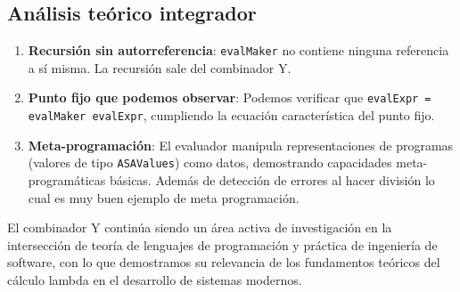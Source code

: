 \documentclass[11pt]{article}
\begin{document}
\subsection{Análisis teórico integrador}
\begin{enumerate}
    \item \textbf{Recursión sin autorreferencia}: \texttt{evalMaker} no contiene ninguna referencia a sí misma. La recursión sale del combinador Y.

    \item \textbf{Punto fijo que podemos observar}: Podemos verificar que \texttt{evalExpr = evalMaker evalExpr}, cumpliendo la ecuación característica del punto fijo.

    \item \textbf{Meta-programación}: El evaluador manipula representaciones de programas (valores de tipo \texttt{ASAValues}) como datos, demostrando capacidades meta-programáticas básicas. Adem\'as de detecci\'on de errores al hacer divisi\'on lo cual es muy buen ejemplo de meta programaci\'on.
\end{enumerate}

El combinador Y continúa siendo un área activa de investigación en la intersección de teoría de lenguajes de programación y práctica de ingeniería de software, con lo que demostramos su relevancia de los fundamentos teóricos del cálculo lambda en el desarrollo de sistemas modernos.
\end{document}
